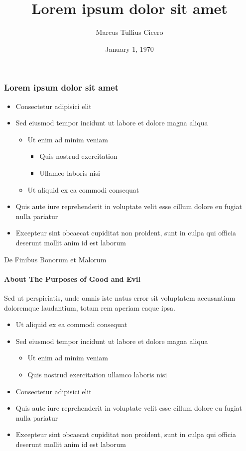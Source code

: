 \documentclass{beamer}
\author{Marcus Tullius Cicero}
\title{Lorem ipsum dolor sit amet}
\institute{Politecnico di Torino}
\date{January 1, 1970}
\begin{document}
\begin{frame}[t,plain]
\titlepage
\end{frame}

\begin{frame}[t]
\frametitle{Lorem ipsum dolor sit amet}

\begin{itemize}
\item Consectetur adipisici elit
\item Sed eiusmod tempor incidunt ut labore et dolore magna aliqua
  \begin{itemize}
  \item Ut enim ad minim veniam
    \begin{itemize}
    \item Quis nostrud exercitation
    \item Ullamco laboris nisi
    \end{itemize}
  \item Ut aliquid ex ea commodi consequat
  \end{itemize}
\item Quis aute iure reprehenderit in voluptate velit esse cillum dolore eu
      fugiat nulla pariatur
\item Excepteur sint obcaecat cupiditat non proident, sunt in culpa qui
      officia deserunt mollit anim id est laborum
\end{itemize}

\end{frame}

\begin{frame}[t]{De Finibus Bonorum et Malorum}
\framesubtitle{About The Purposes of Good and Evil}

Sed ut perspiciatis, unde omnis iste natus error sit voluptatem accusantium
doloremque laudantium, totam rem aperiam eaque ipsa.

\begin{itemize}
\item Ut aliquid ex ea commodi consequat
\item Sed eiusmod tempor incidunt ut labore et dolore magna aliqua
  \begin{itemize}
  \item Ut enim ad minim veniam
  \item Quis nostrud exercitation ullamco laboris nisi
  \end{itemize}
\item Consectetur adipisici elit
\item Quis aute iure reprehenderit in voluptate velit esse cillum dolore eu
      fugiat nulla pariatur
\item Excepteur sint obcaecat cupiditat non proident, sunt in culpa qui
      officia deserunt mollit anim id est laborum
\end{itemize}

\end{frame}
\end{document}
